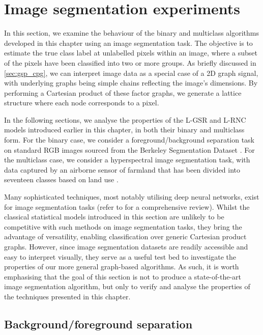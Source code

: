 \section{Image segmentation experiments}

\label{sec:logistic_rnc_application}

In this section, we examine the behaviour of the binary and multiclass algorithms developed in this chapter using an image segmentation task. The objective is to estimate the true class label at unlabelled pixels within an image, where a subset of the pixels have been classified into two or more groups. As briefly discussed in \cref{sec:gsp_cpg}, we can interpret image data as a special case of a 2D graph signal, with underlying graphs being simple chains reflecting the image's dimensions. By performing a Cartesian product of these factor graphs, we generate a lattice structure where each node corresponds to a pixel.

In the following sections, we analyse the properties of the L-GSR and L-RNC models introduced earlier in this chapter, in both their binary and multiclass form. For the binary case, we consider a foreground/background separation task on standard RGB images sourced from the Berkeley Segmentation Dataset \citep{Martin2001}. For the multiclass case, we consider a hyperspectral image segmentation task, with data captured by an airborne sensor of farmland that has been divided into seventeen classes based on land use \citep{Baumgardner2015}. 


Many sophisticated techniques, most notably utilising deep neural networks, exist for image segmentation tasks (refer to \cite{Minaee2022,Wang2022} for a comprehensive review). Whilst the classical statistical models introduced in this section are unlikely to be competitive with such methods on image segmentation tasks, they bring the advantage of versatility, enabling classification over generic Cartesian product graphs. However, since image segmentation datasets are readily accessible and easy to interpret visually, they serve as a useful test bed to investigate the properties of our more general graph-based algorithms. As such, it is worth emphasising that the goal of this section is not to produce a state-of-the-art image segmentation algorithm, but only to verify and analyse the properties of the techniques presented in this chapter. 


\subsection{Background/foreground separation}

